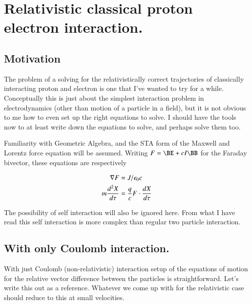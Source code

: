 %

\chapter{Relativistic classical proton electron interaction.}
\label{chap:nuclearInteraction}
{}
\date{Sept 13, 2009}

\beginArtWithToc

\section{Motivation}

The problem of a solving for the relativistically correct trajectories of classically interacting proton and electron is one that I've wanted to try for a while.  Conceptually this is just about the simplest interaction problem in electrodynamics (other than motion of a particle in a field), but it is not obvious to me how to even set up the right equations to solve.  I should have the tools now to at least write down the equations to solve, and perhaps solve them too.

Familiarity with Geometric Algebra, and the STA form of the Maxwell and Lorentz force equation will be assumed.  Writing $F = \BE + c I \BB$ for the Faraday bivector, these equations are respectively

\begin{align}\label{eqn:nuclearInteraction:boo1}
\nabla F &= J/\epsilon_0 c \\
m\frac{d^2 X}{d\tau} &= \frac{q}{c} F \cdot \frac{dX}{d\tau}
\end{align}

The possibility of self interaction will also be ignored here.  From what I have read this self interaction is more complex than regular two particle interaction.

\section{With only Coulomb interaction.}

With just Coulomb (non-relativistic) interaction setup of the equations of motion for the relative vector difference between the particles is straightforward.  Let's write this out as a reference.  Whatever we come up with for the relativistic case should reduce to this at small velocities.

